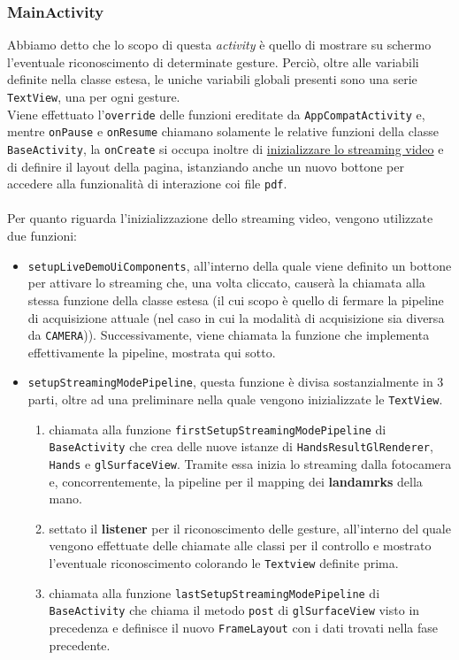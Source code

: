 \subsubsection{MainActivity}
Abbiamo detto che lo scopo di questa \textit{activity} è quello di mostrare su schermo l'eventuale riconoscimento di determinate gesture. Perciò, oltre alle variabili definite nella classe estesa, le uniche variabili globali presenti sono una serie \texttt{TextView}, una per ogni gesture.\\
Viene effettuato l'\texttt{override} delle funzioni ereditate da \texttt{AppCompatActivity} e, mentre \texttt{onPause} e \texttt{onResume} chiamano solamente le relative funzioni della classe \texttt{BaseActivity}, la \texttt{onCreate} si occupa inoltre di \underline{inizializzare lo streaming video} e di definire il layout della pagina, istanziando anche un nuovo bottone per accedere alla funzionalità di interazione coi file \texttt{pdf}.\\
\\
Per quanto riguarda l'inizializzazione dello streaming video, vengono utilizzate due funzioni:
\begin{itemize}
    \item \texttt{setupLiveDemoUiComponents}, all'interno della quale viene definito un bottone per attivare lo streaming che, una volta cliccato, causerà la chiamata alla stessa funzione della classe estesa (il cui scopo è quello di fermare la pipeline di acquisizione attuale (nel caso in cui la modalità di acquisizione sia diversa da \texttt{CAMERA})). Successivamente, viene chiamata la funzione che implementa effettivamente la pipeline, mostrata qui sotto.
    \item \texttt{setupStreamingModePipeline}, questa funzione è divisa sostanzialmente in 3 parti, oltre ad una preliminare nella quale vengono inizializzate le \texttt{TextView}. \begin{enumerate}
        \item chiamata alla funzione \texttt{firstSetupStreamingModePipeline} di \texttt{BaseActivity} che crea delle nuove istanze di \texttt{HandsResultGlRenderer}, \texttt{Hands} e \texttt{glSurfaceView}. Tramite essa inizia lo streaming dalla fotocamera e, concorrentemente, la pipeline per il mapping dei \textbf{landamrks} della mano.
        \item settato il \textbf{listener} per il riconoscimento delle gesture, all'interno del quale vengono effettuate delle chiamate alle classi per il controllo e mostrato l'eventuale riconoscimento colorando le \texttt{Textview} definite prima.
        \item chiamata alla funzione \texttt{lastSetupStreamingModePipeline} di \texttt{BaseActivity} che chiama il metodo \texttt{post} di \texttt{glSurfaceView} visto in precedenza e definisce il nuovo \texttt{FrameLayout} con i dati trovati nella fase precedente.
    \end{enumerate}
\end{itemize}


